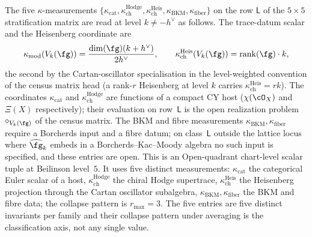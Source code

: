 \begin{remark}
\label{rem:km-five-kappa-stratification}
The five $\kappa$-measurements
$\{\kappa_{\mathrm{cat}}, \kappa^{\mathrm{Hodge}}_{\mathrm{ch}},
\kappa^{\mathrm{Heis}}_{\mathrm{ch}}, \kappa_{\mathrm{BKM}},
\kappa_{\mathrm{fiber}}\}$ on the row $\mathsf{L}$ of the
$5\times 5$ stratification matrix are read at level
$k\neq -h^\vee$ as follows.  The trace-datum scalar and the
Heisenberg coordinate are
\[
\kappa_{\mathrm{mod}}(V_k(\fg))=\frac{\dim(\fg)(k+h^\vee)}{2h^\vee},
\qquad
\kappa^{\mathrm{Heis}}_{\mathrm{ch}}(V_k(\fg))=
\operatorname{rank}(\fg)\cdot k,
\]
the second by the Cartan-oscillator specialisation in the
level-weighted convention of the census matrix head
(a rank-$r$ Heisenberg at level $k$ carries
$\kappa^{\mathrm{Heis}}_{\mathrm{ch}}=rk$).  The coordinates
$\kappa_{\mathrm{cat}}$ and $\kappa^{\mathrm{Hodge}}_{\mathrm{ch}}$
are functions of a compact CY host
($\chi(\cO_X)$ and $\Xi(X)$ respectively); their evaluation on
row~$\mathsf{L}$ is the open realization problem
$\diamond_{V_k(\fg)}$ of the census matrix.  The BKM and fibre
measurements $\kappa_{\mathrm{BKM}}, \kappa_{\mathrm{fiber}}$
require a Borcherds input and a fibre datum; on
class~$\mathsf{L}$ outside the lattice locus where
$\widehat{\fg}_k$ embeds in a Borcherds--Kac--Moody algebra no
such input is specified, and these entries are open.
This is an Open-quadrant chart-level scalar tuple at Beilinson
level~$5$. It uses five distinct measurements:
$\kappa_{\mathrm{cat}}$ the categorical Euler scalar of a host,
$\kappa^{\mathrm{Hodge}}_{\mathrm{ch}}$ the chiral Hodge supertrace,
$\kappa^{\mathrm{Heis}}_{\mathrm{ch}}$ the Heisenberg projection
through the Cartan oscillator subalgebra,
$\kappa_{\mathrm{BKM}}, \kappa_{\mathrm{fiber}}$ the BKM and fibre
data; the collapse pattern is $r_{\max}=3$.
The five entries are five distinct invariants per family
and their collapse pattern under averaging is the
classification axis, not any single value.
\end{remark}

